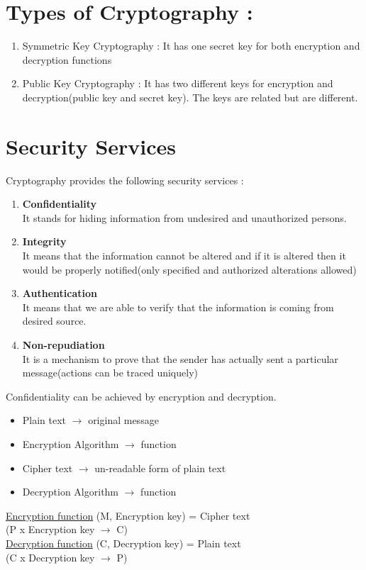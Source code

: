 \documentclass[11pt]{article}
\begin{document}
\section{Types of Cryptography :}
\begin{enumerate}
  \item Symmetric Key Cryptography : It has one secret key for both encryption and decryption functions
  \item Public Key Cryptography : It has two different keys for encryption and decryption(public key and secret key). The keys are related but are different. 
\end{enumerate}

\section{Security Services}
Cryptography provides the following security services : 
\begin{enumerate}
    \item \textbf{Confidentiality}\\
    It stands for hiding information from undesired and unauthorized persons.
    \item \textbf{Integrity}\\
    It means that the information cannot be altered and if it is altered then it would be properly notified(only specified and authorized alterations allowed)
    \item \textbf{Authentication}\\
    It means that we are able to verify that the information is coming from desired source.
    \item \textbf{Non-repudiation}\\
    It is a mechanism to prove that the sender has actually sent a particular message(actions can be traced uniquely)
\end{enumerate}
Confidentiality can be achieved by encryption and decryption.
\begin{itemize}
    \item Plain text $\rightarrow$ original message
    \item Encryption Algorithm $\rightarrow$ function
    \item Cipher text $\rightarrow$ un-readable form of plain text
    \item Decryption Algorithm $\rightarrow$ function
\end{itemize}
\underline{Encryption function} (M, Encryption key) = Cipher text\\
(P x Encryption key $\rightarrow$ C)\\
\underline{Decryption function} (C, Decryption key) = Plain text\\
(C x Decryption key $\rightarrow$ P)
\end{document}
